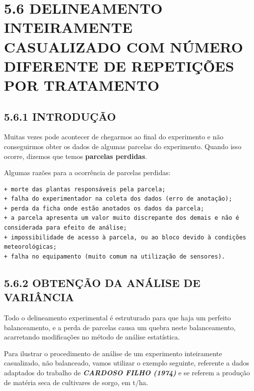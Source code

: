 \documentclass[
]{book}
\begin{document}
\hypertarget{delineamento-inteiramente-casualizado-com-nuxfamero-diferente-de-repetiuxe7uxf5es-por-tratamento}{%
\chapter{5.6 DELINEAMENTO INTEIRAMENTE CASUALIZADO COM NÚMERO DIFERENTE DE REPETIÇÕES POR TRATAMENTO}\label{delineamento-inteiramente-casualizado-com-nuxfamero-diferente-de-repetiuxe7uxf5es-por-tratamento}}

\hypertarget{introduuxe7uxe3o}{%
\section{5.6.1 INTRODUÇÃO}\label{introduuxe7uxe3o}}

Muitas vezes pode acontecer de chegarmos ao final do experimento e não conseguirmos obter os dados de algumas parcelas do experimento. Quando isso ocorre, dizemos que temos \textbf{parcelas perdidas}.

Algumas razões para a ocorrência de parcelas perdidas:

\begin{verbatim}
+ morte das plantas responsáveis pela parcela;
+ falha do experimentador na coleta dos dados (erro de anotação);
+ perda da ficha onde estão anotados os dados da parcela;
+ a parcela apresenta um valor muito discrepante dos demais e não é considerada para efeito de análise;
+ impossibilidade de acesso à parcela, ou ao bloco devido à condições meteorológicas;
+ falha no equipamento (muito comum na utilização de sensores).
\end{verbatim}

\hypertarget{obtenuxe7uxe3o-da-anuxe1lise-de-variuxe2ncia-1}{%
\section{5.6.2 OBTENÇÃO DA ANÁLISE DE VARIÂNCIA}\label{obtenuxe7uxe3o-da-anuxe1lise-de-variuxe2ncia-1}}

Todo o delineamento experimental é estruturado para que haja um perfeito balanceamento, e a perda de parcelas causa um quebra neste balanceamento, acarretando modificações no método de análise estatística.

Para ilustrar o procedimento de análise de um experimento inteiramente casualizado, não balanceado, vamos utilizar o exemplo seguinte, referente a dados adaptados do trabalho de \textbf{\emph{CARDOSO FILHO (1974)}} e se referem a produção de matéria seca de cultivares de sorgo, em t/ha.
\end{document}
